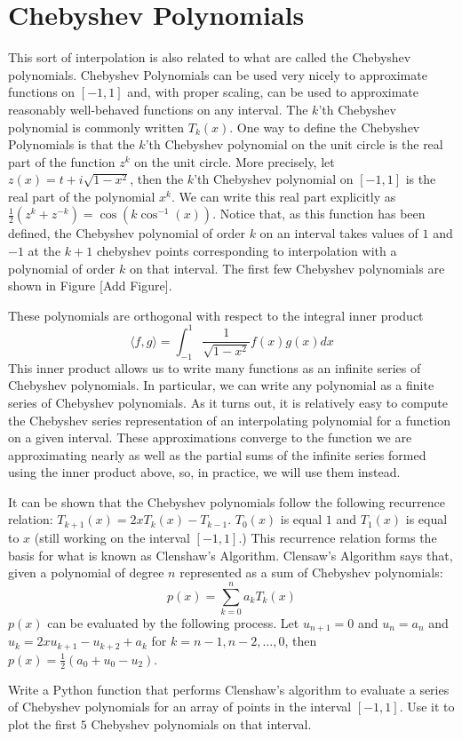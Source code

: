 \section*{Chebyshev Polynomials}
This sort of interpolation is also related to what are called the Chebyshev polynomials.
Chebyshev Polynomials can be used very nicely to approximate functions on $[ -1, 1 ]$ and, with proper scaling, can be used to approximate reasonably well-behaved functions on any interval.
The $k$'th Chebyshev polynomial is commonly written $T_k \left( x \right)$.
One way to define the Chebyshev Polynomials is that the $k$'th Chebyshev polynomial on the unit circle is the real part of the function $z^k$ on the unit circle.
More precisely, let $z(x) = t + i \sqrt{1 - x^2}$, then the $k$'th Chebyshev polynomial on $[-1, 1]$ is the real part of the polynomial $x^k$.
We can write this real part explicitly as $\frac{1}{2} \left( z^k + z^{-k} \right) = \cos \left( k \cos^{-1} \left( x \right) \right)$.
Notice that, as this function has been defined, the Chebyshev polynomial of order $k$ on an interval takes values of $1$ and $-1$ at the $k+1$ chebyshev points corresponding to interpolation with a polynomial of order $k$ on that interval.
The first few Chebyshev polynomials are shown in Figure [Add Figure].

These polynomials are orthogonal with respect to the integral inner product
\[\langle f, g \rangle = \int_{-1}^1 \frac{1}{\sqrt{1 - x^2}} f\left( x \right) g\left( x \right) dx\]
This inner product allows us to write many functions as an infinite series of Chebyshev polynomials.
In particular, we can write any polynomial as a finite series of Chebyshev polynomials.
As it turns out, it is relatively easy to compute the Chebyshev series representation of an interpolating polynomial for a function on a given interval.
These approximations converge to the function we are approximating nearly as well as the partial sums of the infinite series formed using the inner product above, so, in practice, we will use them instead.

It can be shown that the Chebyshev polynomials follow the following recurrence relation: $ T_{k+1} \left( x \right) = 2 x T_k \left( x \right) - T_{k-1}$.
$T_0 \left( x \right)$ is equal $1$ and $T_1 \left( x \right)$ is equal to $x$ (still working on the interval $[-1, 1]$.)
This recurrence relation forms the basis for what is known as Clenshaw's Algorithm.
Clensaw's Algorithm says that, given a polynomial of degree $n$ represented as a sum of Chebyshev polynomials:
\[p\left(x\right) = \sum_{k=0}^{n} a_k T_k\left(x\right)\]
$p(x)$ can be evaluated by the following process.
Let $u_{n+1} = 0$ and $u_{n} = a_n$ and $u_k = 2 x u_{k+1} - u_{k+2} + a_k$ for $k = n-1, n-2, \dots, 0$, then $p(x) = \frac{1}{2} \left( a_0 + u_0 - u_2 \right)$.

\begin{problem}
Write a Python function that performs Clenshaw's algorithm to evaluate a series of Chebyshev polynomials for an array of points in the interval $[-1, 1]$.
Use it to plot the first $5$ Chebyshev polynomials on that interval.
\end{problem}

